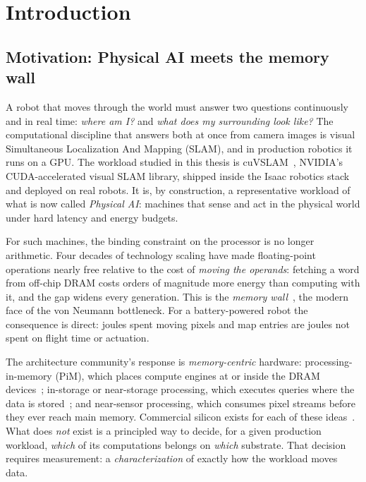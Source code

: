 \chapter{Introduction}
\label{ch:intro}

\section{Motivation: Physical AI meets the memory wall}

A robot that moves through the world must answer two questions continuously
and in real time: \emph{where am I?} and \emph{what does my surrounding look
like?} The computational discipline that answers both at once from camera
images is visual Simultaneous Localization And Mapping (SLAM), and in
production robotics it runs on a GPU. The workload studied in this thesis is
cuVSLAM~\cite{cuvslam2025}, NVIDIA's CUDA-accelerated visual SLAM library,
shipped inside the Isaac robotics stack and deployed on real robots. It is,
by construction, a representative workload of what is now called
\emph{Physical AI}: machines that sense and act in the physical world under
hard latency and energy budgets.

For such machines, the binding constraint on the processor is no longer
arithmetic. Four decades of technology scaling have made floating-point
operations nearly free relative to the cost of \emph{moving the operands}:
fetching a word from off-chip DRAM costs orders of magnitude more energy than
computing with it, and the gap widens every generation. This is the
\emph{memory wall}~\cite{wulf1995memorywall}, the modern face of the von
Neumann bottleneck. For a battery-powered robot the consequence is direct:
joules spent moving pixels and map entries are joules not spent on flight
time or actuation.

The architecture community's response is \emph{memory-centric} hardware:
processing-in-memory (PiM), which places compute engines at or inside the
DRAM devices~\cite{mutlu2019pim,ghose2019pim}; in-storage or near-storage
processing, which executes queries where the data is
stored~\cite{do2013smartssd,gu2016biscuit}; and near-sensor processing, which
consumes pixel streams before they ever reach main memory. Commercial silicon
exists for each of these ideas~\cite{gomezluna2021upmem,kwon2021hbmpim,
lee2022aim}. What does \emph{not} exist is a principled way to decide, for a
given production workload, \emph{which} of its computations belongs on
\emph{which} substrate. That decision requires measurement: a
\emph{characterization} of exactly how the workload moves data.

